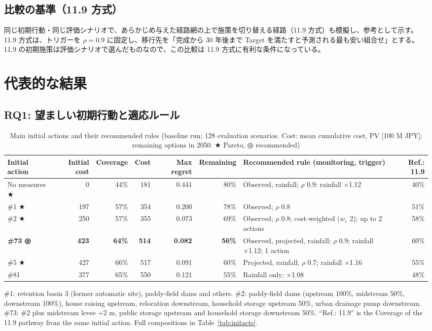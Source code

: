 \documentclass[a4paper,10pt]{ltjsarticle}
\begin{document}


\subsection{比較の基準（11.9 方式）}
同じ初期行動・同じ評価シナリオで、あらかじめ与えた経路網の上で施策を切り替える経路（11.9 方式）も模擬し、参考として示す。
11.9 方式は、トリガーを $\rho=0.9$ に固定し、移行先を「完成から 30 年後まで Target を満たすと予測される最も安い組合せ」とする。
11.9 の初期施策は評価シナリオで選んだものなので、この比較は 11.9 方式に有利な条件になっている。

\section{代表的な結果}
\label{sec:results}

\subsection{RQ1: 望ましい初期行動と適応ルール}
\begin{table}[H]
\centering\small
\setlength{\tabcolsep}{4pt}\caption{Main initial actions and their recommended rules (baseline run; 128 evaluation scenarios. Cost: mean cumulative cost, PV [100 M JPY]; remaining options in 2050. ★ Pareto, ◎ recommended)}
\label{tab:init}
\begin{tabularx}{\textwidth}{@{}>{\raggedright\arraybackslash}p{24mm} r r r r r L r@{}}
\toprule
Initial action & Initial cost & Coverage & Cost & Max regret & Remaining & Recommended rule (monitoring, trigger) & Ref.: 11.9 \\
\midrule
No measures ★ & 0 & 44\% & 181 & 0.441 & 80\% & Observed, rainfall; $\rho$ 0.9; rainfall ×1.12 & 40\% \\
\#1 ★ & 197 & 57\% & 354 & 0.200 & 78\% & Observed; $\rho$ 0.8 & 51\% \\
\#2 ★ & 250 & 57\% & 355 & 0.073 & 69\% & Observed; $\rho$ 0.8; cost-weighted ($w_c$ 2); up to 2 actions & 58\% \\
\textbf{\#73 ◎} & \textbf{423} & \textbf{64\%} & \textbf{514} & \textbf{0.082} & \textbf{56\%} & Observed, projected, rainfall; $\rho$ 0.9; rainfall ×1.12; 1 action & 60\% \\
\#5 ★ & 427 & 66\% & 517 & 0.091 & 60\% & Projected, rainfall; $\rho$ 0.7; rainfall ×1.16 & 55\% \\
\#81 & 377 & 65\% & 550 & 0.121 & 55\% & Rainfall only; ×1.08 & 48\% \\
\bottomrule
\end{tabularx}
\par\footnotesize \#1: retention basin 3 (former automatic site), paddy-field dams and others. \#2: paddy-field dams (upstream 100\%, midstream 50\%, downstream 100\%), house raising upstream, relocation downstream, household storage upstream 50\%, urban drainage pump downstream.
\#73: \#2 plus midstream levee +2 m, public storage upstream and household storage downstream 50\%. ``Ref.: 11.9'' is the Coverage of the 11.9 pathway from the same initial action. Full compositions in Table~\ref{tab:initacts}.
\end{table}
\end{document}
